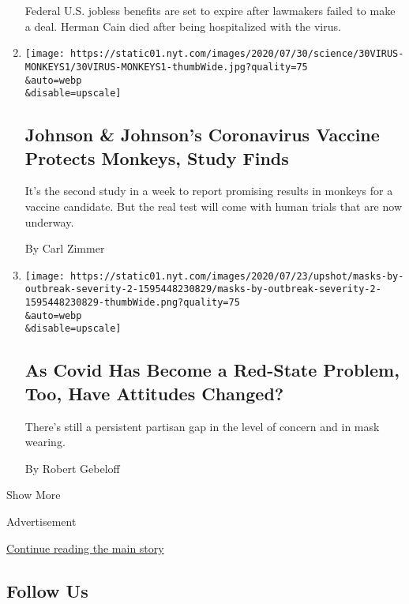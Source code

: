 \begin{enumerate}
  Federal U.S. jobless benefits are set to expire after lawmakers failed
  to make a deal. Herman Cain died after being hospitalized with the
  virus.
\item
  \href{/2020/07/30/health/covid-19-vaccine-monkeys.html}{}

  \texttt{[image: https://static01.nyt.com/images/2020/07/30/science/30VIRUS-MONKEYS1/30VIRUS-MONKEYS1-thumbWide.jpg?quality=75\\\&auto=webp\\\&disable=upscale]}

  \hypertarget{johnson--johnsons-coronavirus-vaccine-protects-monkeys-study-finds}{%
  \subsection{Johnson \& Johnson's Coronavirus Vaccine Protects Monkeys,
  Study
  Finds}\label{johnson--johnsons-coronavirus-vaccine-protects-monkeys-study-finds}}

  It's the second study in a week to report promising results in monkeys
  for a vaccine candidate. But the real test will come with human trials
  that are now underway.

  By Carl Zimmer
\item
  \href{/2020/07/30/upshot/coronavirus-republican-voting.html}{}

  \texttt{[image: https://static01.nyt.com/images/2020/07/23/upshot/masks-by-outbreak-severity-2-1595448230829/masks-by-outbreak-severity-2-1595448230829-thumbWide.png?quality=75\\\&auto=webp\\\&disable=upscale]}

  \hypertarget{as-covid-has-become-a-red-state-problem-too-have-attitudes-changed}{%
  \subsection{As Covid Has Become a Red-State Problem, Too, Have
  Attitudes
  Changed?}\label{as-covid-has-become-a-red-state-problem-too-have-attitudes-changed}}

  There's still a persistent partisan gap in the level of concern and in
  mask wearing.

  By Robert Gebeloff
\end{enumerate}

Show More

Advertisement

\protect\hyperlink{after-mid3}{Continue reading the main story}

\hypertarget{follow-us}{%
\subsection{Follow Us}\label{follow-us}}

